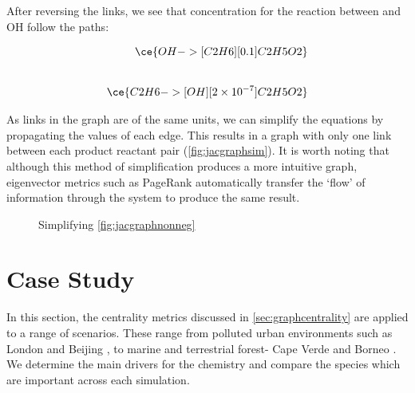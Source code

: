 After reversing the links, we see that concentration for the reaction between  and OH follow the paths:

\begin{eqnarray}
    \ce{OH ->[C2H6][0.1] C2H5O2} \\[20pt]
    \ce{C2H6 ->[OH][2\times10^{-7}] C2H5O2}
\end{eqnarray}



As links in the graph are of the same units, we can simplify the equations by propagating the values of each edge.  This results in a graph with only one link between each product reactant pair (\autoref{fig:jacgraphsim}). It is worth noting that although this method of simplification produces a more intuitive graph, eigenvector metrics such as PageRank automatically transfer the `flow' of information through the system to produce the same result.

\begin{figure}[H]
\begin{center}

\end{center}

\caption{ Simplifying \autoref{fig:jacgraphnonneg}}
\label{fig:jacgraphsim}
\end{figure}


\section{Case Study}\label{sec:metriccase}
In this section, the centrality metrics discussed in \autoref{sec:graphcentrality} are applied to a range of scenarios. These range from polluted urban environments such as London \citep{clfo} and Beijing \cite{aphh}, to marine and terrestrial forest- Cape Verde \citep{capeverde} and Borneo \citep{borneo}. We determine the main drivers for the chemistry and compare the species which are important across each simulation.

